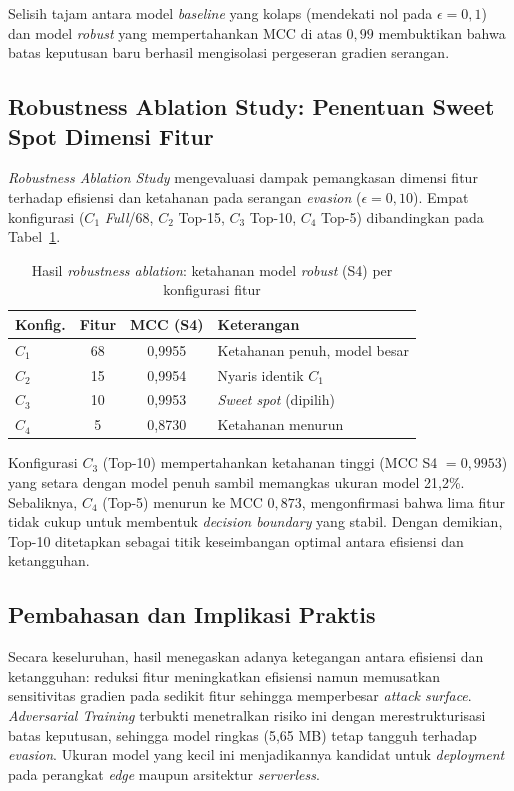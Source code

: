 \documentclass[10pt,twocolumn,a4paper]{extarticle}
\begin{document}
Selisih tajam antara model \textit{baseline} yang kolaps (mendekati nol pada $\epsilon = 0{,}1$) dan model \textit{robust} yang mempertahankan MCC di atas $0{,}99$ membuktikan bahwa batas keputusan baru berhasil mengisolasi pergeseran gradien serangan.

\subsection{Robustness Ablation Study: Penentuan Sweet Spot Dimensi Fitur}
\textit{Robustness Ablation Study} mengevaluasi dampak pemangkasan dimensi fitur terhadap efisiensi dan ketahanan pada serangan \textit{evasion} ($\epsilon = 0{,}10$). Empat konfigurasi ($C_1$ \textit{Full}/68, $C_2$ Top-15, $C_3$ Top-10, $C_4$ Top-5) dibandingkan pada Tabel~\ref{tab:robustness_ablation}.

\begin{table}[htbp]
\caption{Hasil \textit{robustness ablation}: ketahanan model \textit{robust} (S4) per konfigurasi fitur}
\label{tab:robustness_ablation}
\centering
\footnotesize
\begin{tabularx}{\linewidth}{@{} l c c X @{}}
\toprule
\textbf{Konfig.} & \textbf{Fitur} & \textbf{MCC (S4)} & \textbf{Keterangan} \\ \midrule
$C_1$ & 68 & 0,9955 & Ketahanan penuh, model besar \\
$C_2$ & 15 & 0,9954 & Nyaris identik $C_1$ \\
$C_3$ & 10 & 0,9953 & \textit{Sweet spot} (dipilih) \\
$C_4$ & 5 & 0,8730 & Ketahanan menurun \\ \bottomrule
\end{tabularx}
\end{table}

Konfigurasi $C_3$ (Top-10) mempertahankan ketahanan tinggi (MCC S4 $= 0{,}9953$) yang setara dengan model penuh sambil memangkas ukuran model 21,2\%. Sebaliknya, $C_4$ (Top-5) menurun ke MCC $0{,}873$, mengonfirmasi bahwa lima fitur tidak cukup untuk membentuk \textit{decision boundary} yang stabil. Dengan demikian, Top-10 ditetapkan sebagai titik keseimbangan optimal antara efisiensi dan ketangguhan.

\subsection{Pembahasan dan Implikasi Praktis}
Secara keseluruhan, hasil menegaskan adanya ketegangan antara efisiensi dan ketangguhan: reduksi fitur meningkatkan efisiensi namun memusatkan sensitivitas gradien pada sedikit fitur sehingga memperbesar \textit{attack surface}. \textit{Adversarial Training} terbukti menetralkan risiko ini dengan merestrukturisasi batas keputusan, sehingga model ringkas (5,65 MB) tetap tangguh terhadap \textit{evasion}. Ukuran model yang kecil ini menjadikannya kandidat untuk \textit{deployment} pada perangkat \textit{edge} maupun arsitektur \textit{serverless}.
\end{document}
